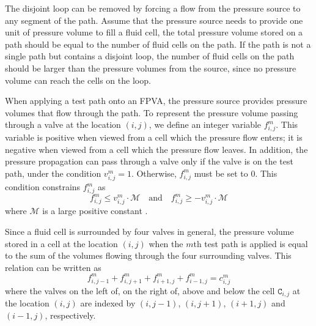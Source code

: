 The disjoint loop can be removed by forcing a flow from the pressure source
to any segment of the path. Assume that the pressure source needs to provide one
unit of pressure volume to fill a fluid cell, the total pressure volume stored
on a path should be equal to the number of fluid cells on the path. If the path
is not a single path but contains a disjoint loop, the number of fluid cells on
the path should be larger than the pressure volumes from the source, since
no pressure volume can reach the cells on the loop. 

When applying a test path onto an FPVA, the pressure source provides pressure
volumes that flow through the path.
To represent the pressure volume passing through a valve at the
location $(i,j)$,  we define an integer variable $f^m_{i,j}$.  This variable is
positive when viewed from a cell which the pressure flow enters; it is negative
when viewed from a cell which the pressure flow leaves. In addition, the pressure
propagation can pass through a valve only if the valve is on the test path, under the
condition $v^m_{i,j}=1$. Otherwise, $f^m_{i,j}$ must be set to 0. This
condition constrains $f^m_{i,j}$ as
\begin{equation}
  \label{eq:flow_var}
  f^m_{i,j}\le v^m_{i,j}\cdot\mathcal{M} \quad \text{and}\quad f^m_{i,j}\ge
  -v^m_{i,j}\cdot\mathcal{M} 
\end{equation}
where $\mathcal{M}$ is a large positive constant %
\cite{chen2011applied}.

Since a fluid cell is surrounded by four valves in general,
the pressure volume stored in a cell at the location $(i,j)$ 
when the $m$th test path is applied is equal to the sum of the
volumes flowing through the four surrounding valves. 
This relation can be written as
\begin{equation}
\label{eq:flow_sum}
f^m_{i,j-1}+ f^m_{i,j+1}+ f^m_{i+1,j}+ f^m_{i-1,j} = c^m_{i,j}
\end{equation} 
where the valves on the left of, on the right of, above and below the cell
$\mathtt{C}_{i,j}$ at the location
$(i,j)$ are indexed by $(i,j-1)$, $(i,j+1)$, $(i+1,j)$ and $(i-1,j)$,
respectively. 


